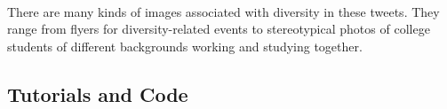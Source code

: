 \documentclass[11pt]{article}
\begin{document}
    \begin{center}
    \end{center}
    { \hspace*{\fill} \\}
    
    There are many kinds of images associated with diversity in these
tweets. They range from flyers for diversity-related events to
stereotypical photos of college students of different backgrounds
working and studying together.

    \hypertarget{tutorials-and-code}{%
\subsection{Tutorials and Code}\label{tutorials-and-code}}
\end{document}
